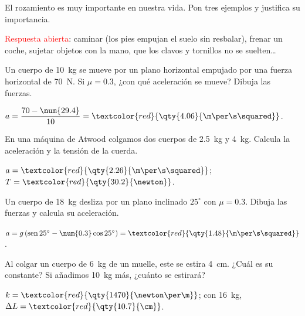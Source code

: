 \begin{exercise}
    El rozamiento es muy importante en nuestra vida. Pon tres ejemplos y justifica su importancia.
    \begin{solu}
        \textcolor{red}{Respuesta abierta}: caminar (los pies empujan el suelo sin resbalar), frenar un coche, sujetar objetos con la
        mano, que los clavos y tornillos no se suelten\dots
    \end{solu}
\end{exercise}

\begin{exercise}
    Un cuerpo de \qty{10}{\kg} se mueve por un plano horizontal empujado por una fuerza horizontal de \qty{70}{\newton}. Si
    \(\mu = \num{0.3}\), ¿con qué aceleración se mueve? Dibuja las fuerzas.
    \begin{solu}
        \(a = \dfrac{70 - \num{29.4}}{10} = \textcolor{red}{\qty{4.06}{\m\per\s\squared}}\).
    \end{solu}
\end{exercise}

\begin{exercise}
    En una máquina de Atwood colgamos dos cuerpos de \qty{2.5}{\kg} y \qty{4}{\kg}. Calcula la aceleración y la tensión de la cuerda.
    \begin{solu}
        \(a = \textcolor{red}{\qty{2.26}{\m\per\s\squared}}\); \(T = \textcolor{red}{\qty{30.2}{\newton}}\).
    \end{solu}
\end{exercise}

\begin{exercise}
    Un cuerpo de \qty{18}{\kg} desliza por un plano inclinado \(25^\circ\) con \(\mu = \num{0.3}\). Dibuja las fuerzas y calcula su
    aceleración.
    \begin{solu}
        \(a = g\,(\sen 25^\circ - \num{0.3}\cos 25^\circ) = \textcolor{red}{\qty{1.48}{\m\per\s\squared}}\).
    \end{solu}
\end{exercise}

\begin{exercise}
    Al colgar un cuerpo de \qty{6}{\kg} de un muelle, este se estira \qty{4}{\cm}. ¿Cuál es su constante? Si añadimos \qty{10}{\kg} más,
    ¿cuánto se estirará?
    \begin{solu}
        \(k = \textcolor{red}{\qty{1470}{\newton\per\m}}\); con \qty{16}{\kg}, \(\Delta L = \textcolor{red}{\qty{10.7}{\cm}}\).
    \end{solu}
\end{exercise}


